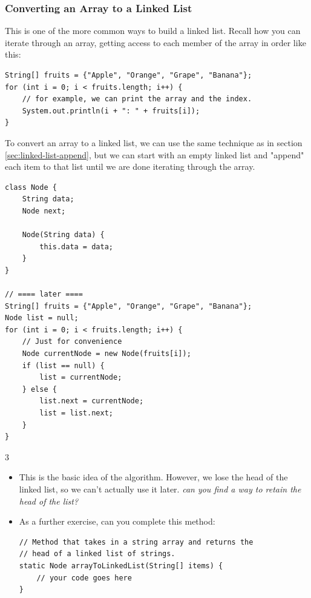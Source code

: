 \documentclass[./main.tex]{subfiles}
\begin{document}
\subsubsection{Converting an Array to a Linked List}
\label{sec:array-to-ll}

This is one of the more common ways to build a linked list. Recall how you can iterate
through an array, getting access to each member of the array in order like this:

\begin{verbatim}
String[] fruits = {"Apple", "Orange", "Grape", "Banana"};
for (int i = 0; i < fruits.length; i++) {
    // for example, we can print the array and the index.
    System.out.println(i + ": " + fruits[i]);
}
\end{verbatim}

To convert an array to a linked list, we can use the same technique as in section \ref{sec:linked-list-append},
but we can start with an empty linked list and "append" each item to that list until we are done
iterating through the array.

\begin{verbatim}
class Node {
    String data;
    Node next;

    Node(String data) {
        this.data = data;
    }
}

// ==== later ====
String[] fruits = {"Apple", "Orange", "Grape", "Banana"};
Node list = null;
for (int i = 0; i < fruits.length; i++) {
    // Just for convenience
    Node currentNode = new Node(fruits[i]);  
    if (list == null) {
        list = currentNode;
    } else {
        list.next = currentNode;
        list = list.next;
    }
}
\end{verbatim}

\begin{tryitbox}{3}
    \begin{itemize}
        \item This is the basic idea of the algorithm. However, we lose the head of the linked list, so we can't
              actually use it later. \emph{can you find a way to retain the head of the list?}
        \item As a further exercise, can you complete this method:
              \begin{verbatim}
// Method that takes in a string array and returns the
// head of a linked list of strings.
static Node arrayToLinkedList(String[] items) {
    // your code goes here
}
              \end{verbatim}
    \end{itemize}

\end{tryitbox}
\end{document}
